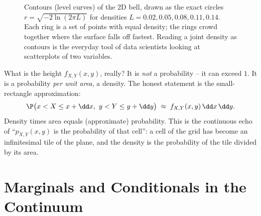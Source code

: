 \begin{figure}[H]
\centering
{}
\caption{Contours (level curves) of the 2D bell, drawn as the exact circles
$r=\sqrt{-2\ln(2\pi L)}$ for densities $L=0.02,0.05,0.08,0.11,0.14$. Each ring is
a set of points with equal density; the rings crowd together where the surface
falls off fastest. Reading a joint density as contours is the everyday tool of
data scientists looking at scatterplots of two variables.}
\label{ch13:fig-contour}
\end{figure}

\begin{happeningbox}
What is the height $f_{X,Y}(x,y)$, really? It is \emph{not} a probability -- it
can exceed $1$. It is a probability \emph{per unit area}, a density. The honest
statement is the small-rectangle approximation:
\[
  \P\big(x < X \le x+\dd x,\ y < Y \le y+\dd y\big)
  \;\approx\; f_{X,Y}(x,y)\,\dd x\,\dd y .
\]
Density times area equals (approximate) probability. This is the continuous echo
of ``$p_{X,Y}(x,y)$ is the probability of that cell'': a cell of the grid has
become an infinitesimal tile of the plane, and the density is the probability of
the tile divided by its area.
\end{happeningbox}

\section{Marginals and Conditionals in the Continuum}
\label{ch13:continuous-marg-cond}

